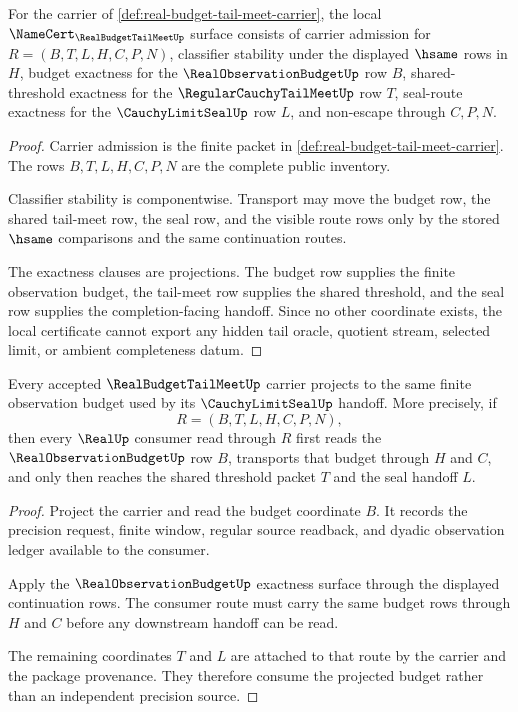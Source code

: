 \begin{theorem}
\label{thm:real-budget-tail-meet-namecert-obligations}
For the carrier of \autoref{def:real-budget-tail-meet-carrier}, the local $\NameCert_{\RealBudgetTailMeetUp}$ surface consists of carrier admission for $R=(B,T,L,H,C,P,N)$, classifier stability under the displayed $\hsame$ rows in $H$, budget exactness for the $\RealObservationBudgetUp$ row $B$, shared-threshold exactness for the $\RegularCauchyTailMeetUp$ row $T$, seal-route exactness for the $\CauchyLimitSealUp$ row $L$, and non-escape through $C,P,N$.
\end{theorem}
\begin{proof}
Carrier admission is the finite packet in \autoref{def:real-budget-tail-meet-carrier}. The rows $B,T,L,H,C,P,N$ are the complete public inventory.

Classifier stability is componentwise. Transport may move the budget row, the shared tail-meet row, the seal row, and the visible route rows only by the stored $\hsame$ comparisons and the same continuation routes.

The exactness clauses are projections. The budget row supplies the finite observation budget, the tail-meet row supplies the shared threshold, and the seal row supplies the completion-facing handoff. Since no other coordinate exists, the local certificate cannot export any hidden tail oracle, quotient stream, selected limit, or ambient completeness datum.
\end{proof}

\begin{theorem}
\label{thm:real-budget-tail-meet-budget-projection}
Every accepted $\RealBudgetTailMeetUp$ carrier projects to the same finite observation budget used by its $\CauchyLimitSealUp$ handoff. More precisely, if
$$
R=(B,T,L,H,C,P,N),
$$
then every $\RealUp$ consumer read through $R$ first reads the $\RealObservationBudgetUp$ row $B$, transports that budget through $H$ and $C$, and only then reaches the shared threshold packet $T$ and the seal handoff $L$.
\end{theorem}
\begin{proof}
Project the carrier and read the budget coordinate $B$. It records the precision request, finite window, regular source readback, and dyadic observation ledger available to the consumer.

Apply the $\RealObservationBudgetUp$ exactness surface through the displayed continuation rows. The consumer route must carry the same budget rows through $H$ and $C$ before any downstream handoff can be read.

The remaining coordinates $T$ and $L$ are attached to that route by the carrier and the package provenance. They therefore consume the projected budget rather than an independent precision source.
\end{proof}

